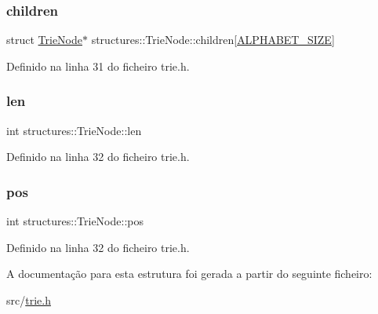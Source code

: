 \subsubsection{\texorpdfstring{children}{children}}
{\footnotesize\ttfamily struct \hyperlink{structstructures_1_1_trie_node}{Trie\+Node}$\ast$ structures\+::\+Trie\+Node\+::children\mbox{[}\hyperlink{trie_8h_a6572f1706059832f94025fa12c6c45ed}{A\+L\+P\+H\+A\+B\+E\+T\+\_\+\+S\+I\+ZE}\mbox{]}}



Definido na linha 31 do ficheiro trie.\+h.

\mbox{\label{structstructures_1_1_trie_node_a4cc910f321fc31a5d51b65ad0fe338c9}} 
\subsubsection{\texorpdfstring{len}{len}}
{\footnotesize\ttfamily int structures\+::\+Trie\+Node\+::len}



Definido na linha 32 do ficheiro trie.\+h.

\mbox{\label{structstructures_1_1_trie_node_a56bdf19e4eadeafdb4480b55c5758ced}} 
\subsubsection{\texorpdfstring{pos}{pos}}
{\footnotesize\ttfamily int structures\+::\+Trie\+Node\+::pos}



Definido na linha 32 do ficheiro trie.\+h.



A documentação para esta estrutura foi gerada a partir do seguinte ficheiro\+:\begin{DoxyCompactItemize}
\item 
src/\hyperlink{trie_8h}{trie.\+h}\end{DoxyCompactItemize}
